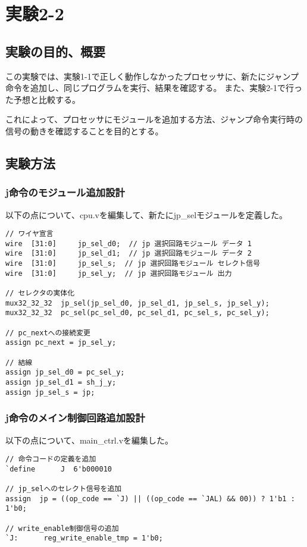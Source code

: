 \section{実験2-2}
\subsection{実験の目的、概要}
この実験では、実験1-1で正しく動作しなかったプロセッサに、新たにジャンプ命令を追加し、同じプログラムを実行、結果を確認する。
また、実験2-1で行った予想と比較する。

これによって、プロセッサにモジュールを追加する方法、ジャンプ命令実行時の信号の動きを確認することを目的とする。

\subsection{実験方法}
\subsubsection{j命令のモジュール追加設計}
以下の点について、cpu.vを編集して、新たにjp\_selモジュールを定義した。
\begin{lstlisting}[caption={addiu命令の追加設計},label={addiu命令の追加設計}]
// ワイヤ宣言
wire  [31:0]     jp_sel_d0;  // jp 選択回路モジュール データ 1
wire  [31:0]     jp_sel_d1;  // jp 選択回路モジュール データ 2
wire  [31:0]     jp_sel_s;  // jp 選択回路モジュール セレクト信号
wire  [31:0]     jp_sel_y;  // jp 選択回路モジュール 出力

// セレクタの実体化
mux32_32_32  jp_sel(jp_sel_d0, jp_sel_d1, jp_sel_s, jp_sel_y);
mux32_32_32  pc_sel(pc_sel_d0, pc_sel_d1, pc_sel_s, pc_sel_y);

// pc_nextへの接続変更
assign pc_next = jp_sel_y;

// 結線
assign jp_sel_d0 = pc_sel_y;
assign jp_sel_d1 = sh_j_y;
assign jp_sel_s = jp;
\end{lstlisting}

\subsubsection{j命令のメイン制御回路追加設計}
以下の点について、main\_ctrl.vを編集した。
\begin{lstlisting}[caption={sw命令の追加設計},label={sw命令の追加設計}]
// 命令コードの定義を追加
`define  	 J  6'b000010

// jp_selへのセレクト信号を追加
assign  jp = ((op_code == `J) || ((op_code == `JAL) && 00)) ? 1'b1 : 1'b0;

// write_enable制御信号の追加
`J:      reg_write_enable_tmp = 1'b0;
\end{lstlisting}

